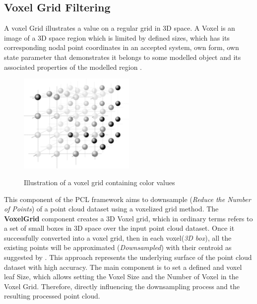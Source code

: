 \documentclass[12pt]{report}
\begin{document}
\subsection{Voxel Grid Filtering}
\label{section:Voxel Grid Filtering}

A voxel Grid illustrates a value on a regular grid in 3D space. A Voxel is an image of a 3D space region  which is limited by defined sizes, which has its corresponding nodal point coordinates in an accepted system,
own form, own state parameter that demonstrates it belongs to some modelled object and its associated properties of the modelled region . 

\begin{figure}[H]%
  \centering
  \includegraphics[width=0.5\textwidth]{220px-Voxelgitter.png}
 \caption{Illustration of a voxel grid containing color values}\cite[]{SHCHUROVA201576}
 \label{fig:voxel_repre} 
\end{figure}

This component of the PCL  framework aims to downsample (\textit{Reduce the Number of Points}) of a point cloud dataset using a voxelized grid method.
The \textbf{VoxelGrid} component creates a 3D Voxel grid, which in ordinary terms refers to a set of small boxes in 3D space over the input point cloud dataset. 
Once it successfully converted into a voxel grid, then in each voxel(\textit{3D box}), all the existing points will be approximated (\textit{Downsampled}) with their centroid as suggested by .
This approach represents the underlying surface of the point cloud dataset with high accuracy.
The main component is to set a defined and voxel leaf Size, which allows setting the Voxel Size and the Number of Voxel in the Voxel Grid. Therefore, directly influencing the downsampling process and the resulting processed point cloud.
\end{document}
